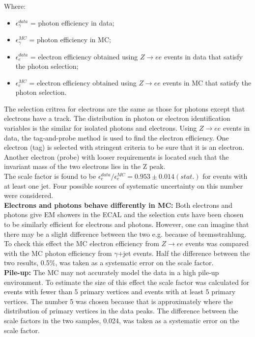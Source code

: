Where:
\begin{itemize}
\item $\epsilon_{\gamma}^{data}$ = photon efficiency in data;
\item $\epsilon_{\gamma}^{MC}$ = photon efficiency in MC;
\item $\epsilon_{e}^{data}$ = electron efficiency obtained using $Z\rightarrow
ee$ events in data that satisfy the photon selection; 
\item $\epsilon_{e}^{MC}$ = electron efficiency obtained using $Z\rightarrow ee$
events in MC that satisfy the photon selection. 
\end{itemize}

The selection critrea for electrons are the same as those for photons except 
that electrons have a track. The distribution in photon or electron 
identification variables is the similar for isolated photons and electrons. 
Using $Z\rightarrow ee$ events in data, the tag-and-probe method is used to find
the electron efficiency. One electron (tag) is selected with stringent criteria 
to be sure that it is an electron. Another electron (probe) with looser 
requirements is located such that the invariant mass of the two electrons lies 
in the Z peak. \\

The scale factor is found to be $\epsilon_{e}^{data}/\epsilon_{e}^{MC} =
0.953\pm 0.014(stat.)$ for events with at least one jet. Four possible sources
of systematic uncertainty on this number were considered. \\

{\bf Electrons and photons behave differently in MC:} Both electrons and photons
give EM showers in the ECAL and the selection cuts have been chosen to be
similarly efficient for electrons and photons. However, one can imagine that
there may be a slight difference between the two e.g. because of bremsstrahlung.
To check this effect the MC electron efficiency from $Z\rightarrow ee$ events
was compared with the MC photon efficiency from $\gamma$+jet events. Half the
difference between the two results, 0.5\%, was taken as a systematic error on
the scale factor. \\

{\bf Pile-up:} The MC may not accurately model the data in a high pile-up
environment. To estimate the size of this effect the scale factor was calculated
for events with fewer than 5 primary vertices and events with at least 5 primary
vertices. The number 5 was chosen because that is approximately where the 
distribution of primary vertices in the data peaks. The difference between the
scale factors in the two samples, 0.024, was taken as a systematic error on the 
scale factor. \\

